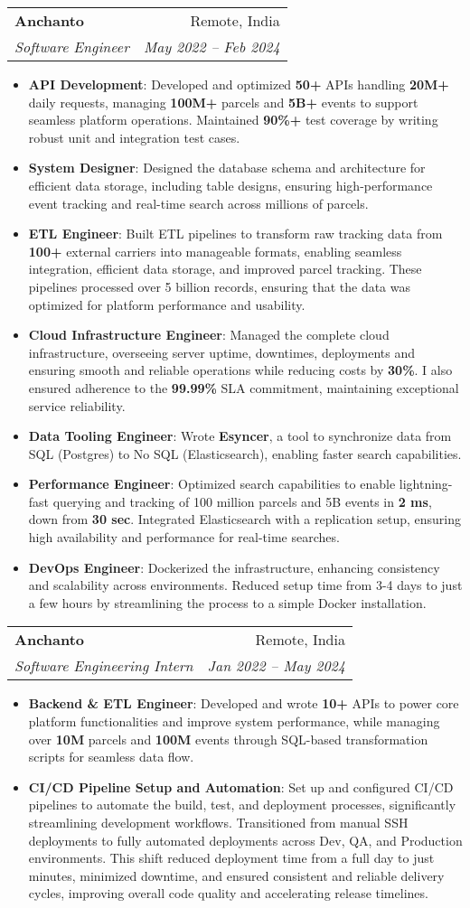 \documentclass[letterpaper,11pt]{article}
\makeatletter
\newcommand{\resumeItem}[2]{
  \item\small{
    \textbf{#1}{: #2 \vspace{-2pt}}
  }
}
\newcommand{\resumeSubheading}[4]{
  \vspace{-1pt}\item
    \begin{tabular*}{0.97\textwidth}[t]{l@{\extracolsep{\fill}}r}
      \textbf{#1} & #2 \\
      \textit{\small#3} & \textit{\small #4} \\
    \end{tabular*}\vspace{-5pt}
}
\newcommand{\resumeItemListStart}{\begin{itemize}}
\newcommand{\resumeItemListEnd}{\end{itemize}\vspace{-5pt}}
\makeatother
\begin{document}
  \resumeSubheading
    {Anchanto}{Remote, India}
    {Software Engineer}{May 2022 -- Feb 2024}
    \resumeItemListStart
      \resumeItem{API Development}
        {Developed and optimized \textbf{50+} APIs handling \textbf{20M+} daily requests, managing \textbf{100M+} parcels and \textbf{5B+} events to support seamless platform operations. Maintained \textbf{90\%+} test coverage by writing robust unit and integration test cases.}
      \resumeItem{System Designer}
        {Designed the database schema and architecture for efficient data storage, including table designs, ensuring high-performance event tracking and real-time search across millions of parcels.}
      \resumeItem{ETL Engineer}
        {Built ETL pipelines to transform raw tracking data from \textbf{100+} external carriers into manageable formats, enabling seamless integration, efficient data storage, and improved parcel tracking. These pipelines processed over 5 billion records, ensuring that the data was optimized for platform performance and usability.}
      \resumeItem{Cloud Infrastructure Engineer}
        {Managed the complete cloud infrastructure, overseeing server uptime, downtimes, deployments and ensuring smooth and reliable operations while reducing costs by \textbf{30\%}. I also ensured adherence to the \textbf{99.99\%} SLA commitment, maintaining exceptional service reliability.}
      \resumeItem{Data Tooling Engineer}
        {Wrote \textbf{Esyncer}, a tool to synchronize data from SQL (Postgres) to No SQL (Elasticsearch), enabling faster search capabilities.}
      \resumeItem{Performance Engineer}
        {Optimized search capabilities to enable lightning-fast querying and tracking of 100 million parcels and 5B events in \textbf{2 ms}, down from \textbf{30 sec}. Integrated Elasticsearch with a replication setup, ensuring high availability and performance for real-time searches.}
      \resumeItem{DevOps Engineer}
        {Dockerized the infrastructure, enhancing consistency and scalability across environments. Reduced setup time from 3-4 days to just a few hours by streamlining the process to a simple Docker installation.}      \resumeItemListEnd
  \resumeSubheading
        {Anchanto}{Remote, India}
        {Software Engineering Intern}{Jan 2022 -- May 2024}
      \resumeItemListStart
      \resumeItem{Backend \& ETL Engineer}
        {Developed and wrote \textbf{10+} APIs to power core platform functionalities and improve system performance, while managing over \textbf{10M} parcels and \textbf{100M} events through SQL-based transformation scripts for seamless data flow.}
      \resumeItem{CI/CD Pipeline Setup and Automation}
        {Set up and configured CI/CD pipelines to automate the build, test, and deployment processes, significantly streamlining development workflows. Transitioned from manual SSH deployments to fully automated deployments across Dev, QA, and Production environments. This shift reduced deployment time from a full day to just minutes, minimized downtime, and ensured consistent and reliable delivery cycles, improving overall code quality and accelerating release timelines.}      \resumeItemListEnd
\end{document}
